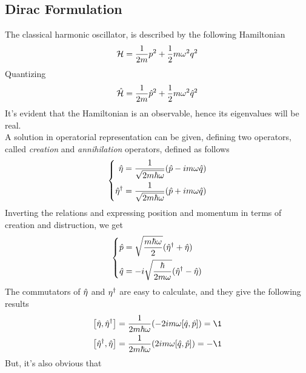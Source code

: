 \documentclass[../qm.tex]{subfiles}
\begin{document}
	\subsection{Dirac Formulation}
	The classical harmonic oscillator, is described by the following Hamiltonian
	\begin{equation}
		\mathcal{H}=\frac{1}{2m}p^2+\frac{1}{2}m\omega^2q^2
		\label{eq:classharmham}
	\end{equation}
	Quantizing
	\begin{equation}
		\hat{\mathcal{H}}=\frac{1}{2m}\hat{p}^2+\frac{1}{2}m\omega^2\hat{q}^2
		\label{eq:qhoham}
	\end{equation}
	It's evident that the Hamiltonian is an observable, hence its eigenvalues will be real.\\
	A solution in operatorial representation can be given, defining two operators, called \textit{creation} and \textit{annihilation} operators, defined as follows
	\begin{equation}
		\left\{ \begin{aligned}
				\hat{\eta}&=\frac{1}{\sqrt{2m\hbar\omega}}(\hat{p}-im\omega\hat{q})\\
				\hat{\eta}^{\dagger}&=\frac{1}{\sqrt{2m\hbar\omega}}(\hat{p}+im\omega\hat{q})
		\end{aligned}\right.
		\label{eq:creationdestruction}
	\end{equation}
	Inverting the relations and expressing position and momentum in terms of creation and distruction, we get
	\begin{equation}
		\left\{ \begin{aligned}
				\hat{p}&=\sqrt{\frac{m\hbar\omega}{2}}(\hat{\eta}^{\dagger}+\hat{\eta})\\
				\hat{q}&=-i\sqrt{\frac{\hbar}{2m\omega}}(\hat{\eta}^{\dagger}-\hat{\eta})
		\end{aligned}\right.
		\label{eq:pqcd}
	\end{equation}
	The commutators of $\hat{\eta}$ and $\eta^{\dagger}$ are easy to calculate, and they give the following results
	\begin{equation}
		\begin{aligned}
			\comm{\opr{\eta}}{\adj{\opr{\eta}}}&=\frac{1}{2m\hbar\omega}(-2im\omega\comm{\opr{q}}{\opr{p}})=\1\\
			\comm{\adj{\opr{\eta}}}{\opr{\eta}}&=\frac{1}{2m\hbar\omega}(2im\omega\comm{\opr{q}}{\opr{p}})=-\1
		\end{aligned}
		\label{eq:comm}
	\end{equation}
	But, it's also obvious that
\end{document}
